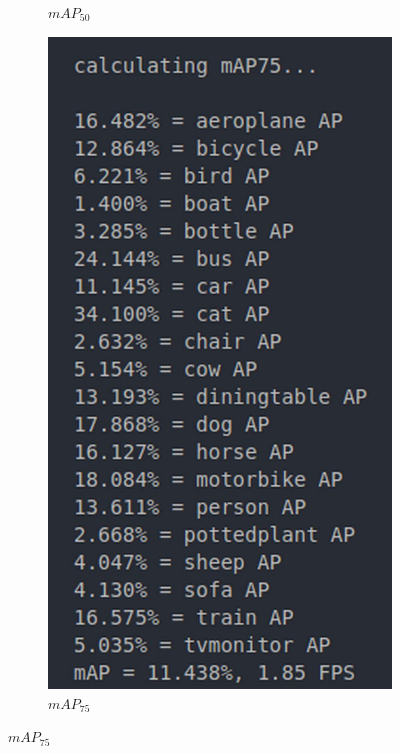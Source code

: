 \begin{figure}[H]
\begin{subfigure}[b]{0.4\textwidth}
        \caption{$mAP_{50}$}
        \label{mAP_50_result}
     \end{subfigure}
     \hfill
     \begin{subfigure}[b]{0.4\textwidth}
         \centering
        \includegraphics[scale=0.15]{Recursos/mAP75_result.jpg}
        \caption{$mAP_{75}$}
        \label{mAP_75_result}
     \end{subfigure}

\end{figure}

